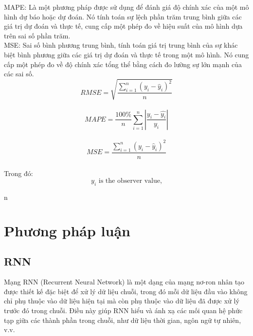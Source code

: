 \documentclass[conference]{IEEEtran}
\begin{document}
MAPE: Là một phương pháp được sử dụng để đánh giá độ chính xác của một mô hình dự báo hoặc dự đoán. Nó tính toán sự lệch phần trăm trung bình giữa các giá trị dự đoán và thực tế, cung cấp một phép đo về hiệu suất của mô hình dựa trên sai số phần trăm.\\

MSE: Sai số bình phương trung bình, tính toán giá trị trung bình của sự khác biệt bình phương giữa các giá trị dự đoán và thực tế trong một mô hình. Nó cung cấp một phép đo về độ chính xác tổng thể bằng cách đo lường sự lớn mạnh của các sai số.\\

\[RMSE = \sqrt{\frac{\sum_{i=1}^{n} (y_i - \hat{y}_i)^2}{n}}\]\\

\[MAPE=\frac{100\%}{n}  \sum_{i=1}^{n} |\frac{y_i-\hat{y_i}}{y_i} | \]\\

\[MSE = \frac{\sum_{i=1}^{n} (y_i - \hat{y}_i)^2}{n}\]\\

Trong đó:\\
$$y_i \text{ is the observer value,}

$$ 

$$n 


\section{\textbf{Phương pháp luận}}
\subsection{RNN}
Mạng RNN (Recurrent Neural Network) là một dạng của mạng nơ-ron nhân tạo được thiết kế đặc biệt để xử lý dữ liệu chuỗi, trong đó mỗi dữ liệu đầu vào không chỉ phụ thuộc vào dữ liệu hiện tại mà còn phụ thuộc vào dữ liệu đã được xử lý trước đó trong chuỗi. Điều này giúp RNN hiểu và ánh xạ các mối quan hệ phức tạp giữa các thành phần trong chuỗi, như dữ liệu thời gian, ngôn ngữ tự nhiên, v.v.
\end{document}
